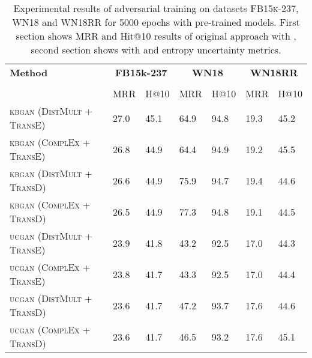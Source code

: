 \begin{table}[H]
    \centering
    \begin{tabular}{lllllll}
        \toprule
        \textbf{Method} &
        \multicolumn{2}{c}{\textbf{FB15k-237}} & 
        \multicolumn{2}{c}{\textbf{WN18}} & 
        \multicolumn{2}{c}{\textbf{WN18RR}}\\
        
        \cmidrule{2-6} \cmidrule{7-7} \\
        {} & MRR & H@10 & MRR & H@10 & MRR & H@10 \\
    
        \midrule
          
          \textsc{kbgan} (\textsc{DistMult} + \textsc{TransE})  
          & 27.0  & 45.1 & 64.9 & 94.8 & 19.3 & 45.2 \\
          
          \textsc{kbgan} (\textsc{ComplEx} + \textsc{TransE})  
          & 26.8  & 44.9 & 64.4 & 94.9 & 19.2 & 45.5 \\
          
          \textsc{kbgan} (\textsc{DistMult} + \textsc{TransD})  
          & 26.6  & 44.9 & 75.9 & 94.7 & 19.4 & 44.6 \\

          \textsc{kbgan} (\textsc{ComplEx} + \textsc{TransD})  
          & 26.5 & 44.9 & 77.3 & 94.8 & 19.1 & 44.5 \\
          
          \midrule
          
          \textsc{ucgan} (\textsc{DistMult} + \textsc{TransE})  
          & 23.9 & 41.8 & 43.2 & 92.5 & 17.0 & 44.3 \\
          
          \textsc{ucgan} (\textsc{ComplEx} + \textsc{TransE})  
          & 23.8 & 41.7 & 43.3 & 92.5 & 17.0 & 44.4 \\
          
          \textsc{ucgan} (\textsc{DistMult} + \textsc{TransD})  
          & 23.6  & 41.7 & 47.2 & 93.7 & 17.6 & 44.6 \\

          \textsc{ucgan} (\textsc{ComplEx} + \textsc{TransD})  
          & 23.6 & 41.7 & 46.5 & 93.2 & 17.6 & 45.1 \\
  
        \bottomrule
    \end{tabular}
    \caption{Experimental results of adversarial training on datasets \textsc{FB15k-237}, \textsc{WN18} and \textsc{WN18RR} for 5000 epochs with pre-trained models.
    First section shows MRR and Hit@10 results of original \kbgan approach with \origsampling, second section shows 
    \usgan with \ussoftmax and entropy uncertainty metrics.}
\label{tab:result_table2_5k_epochs}
\end{table}